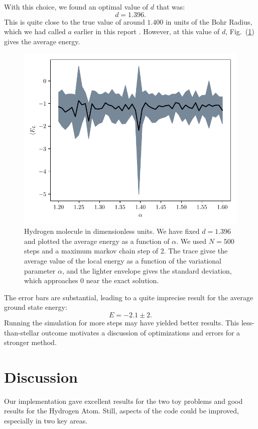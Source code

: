 \documentclass[12pt]{article}
\numberwithin{equation}{section}
\begin{document}
With this choice, we found an optimal value of  $d$ that was:
\begin{equation}
    d = 1.396.
\end{equation}
This is quite close to the true value of around $1.400$ in units of the Bohr Radius, which we had called $a$ earlier in this report \cite{Jensen2}.  However, at this value of $d$, Fig.~(\ref{fig:molecule}) gives the average energy.
\begin{figure}[ht]
    \centering
    \includegraphics{../scripts/hydrogen_molecule1.pdf}
    \caption{Hydrogen molecule in dimensionless units. We have fixed $d = 1.396$ and plotted the average energy as a function of $\alpha$. We used $N = 500$ steps and a maximum markov chain step of 2.  The trace givse the average value of the local energy as a function of the variational parameter $\alpha$, and the lighter envelope gives the standard deviation, which approaches 0 near the exact solution.}
    \label{fig:molecule}
\end{figure}
The error bars are substantial, leading to a quite imprecise result for the average ground state energy:
\begin{equation}
    E = -2.1 \pm 2.
\end{equation}
Running the simulation for more steps may have yielded better results.  This less-than-stellar outcome motivates a discussion of optimizations and errors for a stronger method.

\section{Discussion}
Our implementation gave excellent results for the two toy problems and good results for the Hydrogen Atom.  Still, aspects of the code could be improved, especially in two key areas.
\end{document}
